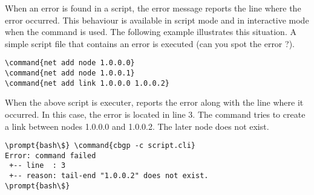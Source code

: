When an error is found in a script, the error message reports the line
where the error occurred. This behaviour is available in script mode
and in interactive mode when the
\hyperref[cmd:include]{} command is used. The
following example illustrates this situation. A simple script file
that contains an error is executed (can you spot the error ?).

\begin{Verbatim}[commandchars=\\\{\}]
\command{net add node 1.0.0.0}
\command{net add node 1.0.0.1}
\command{net add link 1.0.0.0 1.0.0.2}
\end{Verbatim}

When the above script is executer,  reports the
error along with the line where it occurred. In this case, the error
is located in line 3. The command tries to create a link between nodes
1.0.0.0 and 1.0.0.2. The later node does not exist.

\begin{Verbatim}[commandchars=\\\{\}]
\prompt{bash\$} \command{cbgp -c script.cli}
Error: command failed
 +-- line  : 3
 +-- reason: tail-end "1.0.0.2" does not exist.
\prompt{bash\$}
\end{Verbatim}
